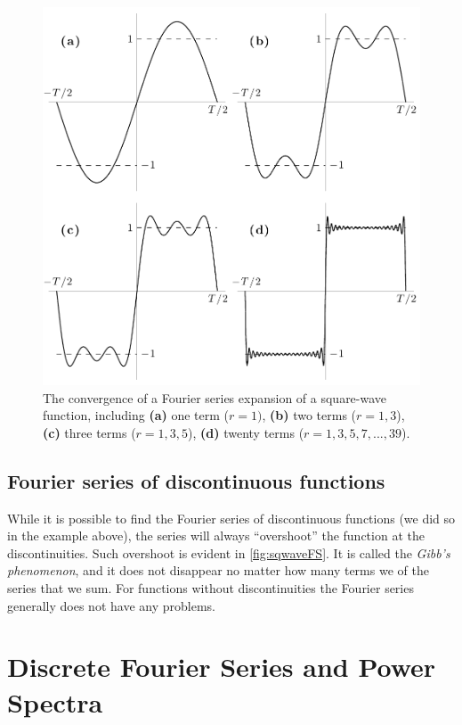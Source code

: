 \documentclass[11pt,twoside,a4paper]{article}
\begin{document}
\begin{figure}[tb]
  \centering
  \includegraphics[width=4.5in]{../figs/L14/FourierSeriesConvergence}
  \caption{The convergence of a Fourier series expansion of a
    square-wave function, including \textbf{(a)} one term ($r=1)$,
    \textbf{(b)} two terms ($r=1,3$), \textbf{(c)} three terms
    ($r=1,3,5$), \textbf{(d)} twenty terms ($r=1,3,5,7,...,39$).}
  \label{fig:sqwaveFS}
\end{figure}

\subsection{Fourier series of discontinuous functions}

While it is possible to find the Fourier series of discontinuous
functions (we did so in the example above), the series will always
``overshoot'' the function at the discontinuities.  Such overshoot is
evident in \autoref{fig:sqwaveFS}.  It is called the \textit{Gibb's
  phenomenon}, and it does not disappear no matter how many terms we
of the series that we sum. For functions without discontinuities the
Fourier series generally does not have any problems.


\section{Discrete Fourier Series and Power Spectra}
\label{sec:dft1}
\end{document}
